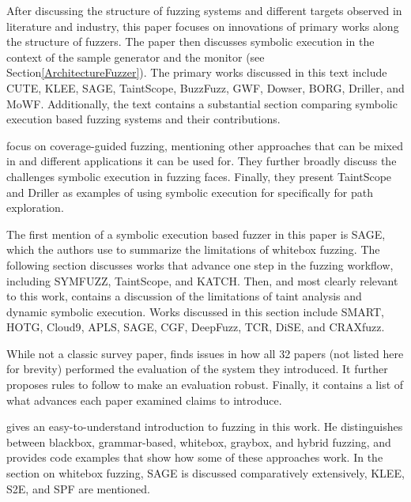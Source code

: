 \documentclass{article}
\begin{document}
\begin{multicols}{2}
    After discussing the structure of fuzzing systems and different targets observed in literature and industry, this paper focuses on innovations of primary works along the structure of fuzzers. The paper then discusses symbolic execution in the context of the sample generator and the monitor (see Section\ref{ArchitectureFuzzer}). The primary works discussed in this text include CUTE\cite{CUTE}, KLEE\cite{KLEE}, SAGE\cite{SAGE}, TaintScope\cite{TaintScope}, BuzzFuzz\cite{BuzzFuzz}, GWF\cite{GWF}, Dowser\cite{Dowser}, BORG\cite{BORG}, Driller\cite{Driller}, and MoWF\cite{MoWF}. Additionally, the text contains a substantial section comparing symbolic execution based fuzzing systems and their contributions.

    \citeauthor{FuzzingASurvey} focus on coverage-guided fuzzing, mentioning other approaches that can be mixed in and different applications it can be used for. They further broadly discuss the challenges symbolic execution in fuzzing faces. Finally, they present TaintScope\cite{TaintScope} and Driller\cite{Driller} as examples of using symbolic execution for specifically for path exploration.

    The first mention of a symbolic execution based fuzzer in this paper is SAGE\cite{SAGE}, which the authors use to summarize the limitations of whitebox fuzzing. The following section discusses works that advance one step in the fuzzing workflow, including SYMFUZZ\cite{SYMFUZZ}, TaintScope\cite{TaintScope}, and KATCH\cite{KATCH}. Then, and most clearly relevant to this work,  contains a discussion of the limitations of taint analysis and dynamic symbolic execution. Works discussed in this section include SMART\cite{SMART}, HOTG\cite{HigherOrderTestGeneration}, Cloud9\cite{Cloud9}, APLS\cite{APLS}, SAGE\cite{SAGE}, CGF\cite{CGF}, DeepFuzz\cite{DeepFuzz}, TCR\cite{TCR}, DiSE\cite{DiSE}, and CRAXfuzz\cite{CRAXfuzz}.

    While not a classic survey paper,  finds issues in how all 32 papers (not listed here for brevity) performed the evaluation of the system they introduced. It further proposes rules to follow to make an evaluation robust. Finally, it contains a list of what advances each paper examined claims to introduce.

    \citeauthor{HackArtScience} gives an easy-to-understand introduction to fuzzing in this work. He distinguishes between blackbox, grammar-based, whitebox, graybox, and hybrid fuzzing, and provides code examples that show how some of these approaches work. In the section on whitebox fuzzing, SAGE\cite{SAGE} is discussed comparatively extensively, KLEE\cite{KLEE}, S2E\cite{S2E}, and SPF\cite{SPF} are mentioned.


\end{multicols}
\end{document}
